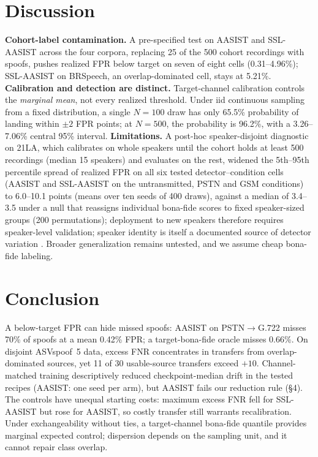 \documentclass{article}
\begin{document}
\section{Discussion}
\textbf{Cohort-label contamination.} A pre-specified test on AASIST and SSL-AASIST across the four corpora, replacing 25 of the 500 cohort recordings with spoofs, pushes realized FPR below target on seven of eight cells (0.31--4.96\%); SSL-AASIST on BRSpeech, an overlap-dominated cell, stays at 5.21\%. \textbf{Calibration and detection are distinct.} Target-channel calibration controls the \emph{marginal mean}, not every realized threshold. Under iid continuous sampling from a fixed distribution, a single $N{=}100$ draw has only 65.5\% probability of landing within $\pm2$ FPR points; at $N{=}500$, the probability is 96.2\%, with a 3.26--7.06\% central 95\% interval. \textbf{Limitations.} A post-hoc speaker-disjoint diagnostic on 21LA, which calibrates on whole speakers until the cohort holds at least 500 recordings (median 15 speakers) and evaluates on the rest, widened the 5th--95th percentile spread of realized FPR on all six tested detector--condition cells (AASIST and SSL-AASIST on the untransmitted, PSTN and GSM conditions) to 6.0--10.1 points (means over ten seeds of 400 draws), against a median of 3.4--3.5 under a null that reassigns individual bona-fide scores to fixed speaker-sized groups (200 permutations); deployment to new speakers therefore requires speaker-level validation; speaker identity is itself a documented source of detector variation \cite{dar26iss}. Broader generalization remains untested, and we assume cheap bona-fide labeling.

\section{Conclusion}
A below-target FPR can hide missed spoofs: AASIST on PSTN$\to$G.722 misses 70\% of spoofs at a mean 0.42\% FPR; a target-bona-fide oracle misses 0.66\%. On disjoint ASVspoof~5 data, excess FNR concentrates in transfers from overlap-dominated sources, yet 11 of 30 usable-source transfers exceed $+10$. Channel-matched training descriptively reduced checkpoint-median drift in the tested recipes (AASIST: one seed per arm), but AASIST fails our reduction rule (\S4). The controls have unequal starting costs: maximum excess FNR fell for SSL-AASIST but rose for AASIST, so costly transfer still warrants recalibration. Under exchangeability without ties, a target-channel bona-fide quantile provides marginal expected control; dispersion depends on the sampling unit, and it cannot repair class overlap.
\end{document}
